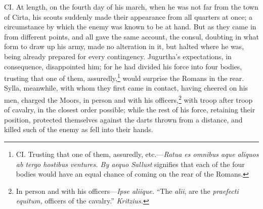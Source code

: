 CI. At length, on the fourth day of his march, when he was not far
from the town of Cirta, his scouts suddenly made their appearance from
all quarters at once; a circumstance by which the enemy was known to
be at hand. But as they came in from different points, and all gave
the same account, the consul, doubting in what form to draw up his
army, made no alteration in it, but halted where he was, being already
prepared for every contingency. Jugurtha's expectations, in consequence,
disappointed him; for he had divided his force into four bodies, trusting
that one of them, assuredly,\footnote{CI. Trusting that one of them, assuredly, etc.—\emph{Ratua es
omnibus aque aliquos ab tergo hostibus ventures. By aequo Sallust}
signifies that each of the four bodies would have an equal chance of
coming on the rear of the Romans.} would surprise the Romans in the rear.
Sylla, meanwhile, with whom they first came in contact, having cheered
on his men, charged the Moors, in person and with his officers,\footnote{In person and with his officers—\emph{Ipse aliique.} ``The
\emph{alii}, are the \emph{praefecti equitum,} officers of the cavalry.''
\emph{Kritzius.}}
with troop after troop of cavalry, in the closest order possible; while
the rest of his force, retaining their position, protected themselves
against the darts thrown from a distance, and killed such of the enemy
as fell into their hands.

